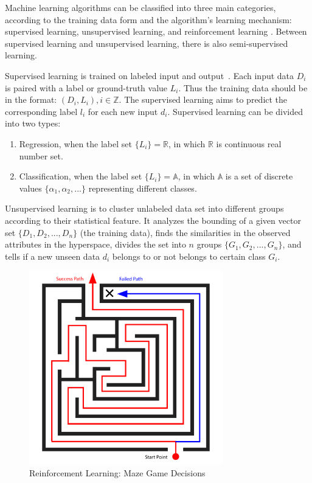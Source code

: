 \begin{spacing}{1.5}
Machine learning algorithms can be classified into three main categories, according to the training data form and the algorithm's learning mechanism: supervised learning, unsupervised learning, and reinforcement learning \cite{mohri2018foundations}. Between supervised learning and unsupervised learning, there is also semi-supervised learning.

Supervised learning is trained on labeled input and output~\cite{sen2020supervised, kotsiantis2007supervised}. Each input data $D_i$ is paired with a label or ground-truth value $L_i$. Thus the training data should be in the format: $(D_i, L_i), i \in \mathbb{Z}$. The supervised learning aims to predict the corresponding label $l_i$ for each new input $d_i$. Supervised learning can be divided into two types: 

\begin{enumerate}
    \item Regression, when the label set $\{L_i\} = \mathbb{R}$, in which $\mathbb{R}$ is continuous real number set.
    \item Classification, when the label set $\{L_i\} = \mathbb{A}$, in which $\mathbb{A}$ is a set of discrete values $\{\alpha_1, \alpha_2, ...\}$ representing different classes.
\end{enumerate}

 Unsupervised learning is to cluster unlabeled data set into different groups according to their statistical feature\cite{meena2019survey}. It analyzes the bounding of a given vector set $\{D_1, D_2, ...,D_n\}$ (the training data), finds the similarities in the observed attributes in the hyperspace, divides the set into $n$ groups $\{G_1, G_2, ..., G_n\}$, and tells if a new unseen data $d_i$ belongs to or not belongs to certain class $G_i$.

\begin{figure}[ht]
\centering
\includegraphics[width=0.75\textwidth, fbox]{Chapter2/reinforcement.pdf}
\caption{Reinforcement Learning: Maze Game Decisions}
\label{fig:reinforcement} 
\end{figure}


\end{spacing}
